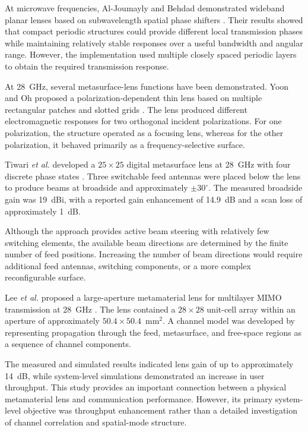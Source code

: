 At microwave frequencies, Al-Joumayly and Behdad demonstrated
wideband planar lenses based on subwavelength spatial phase shifters
\cite{Al-Joumayly2011}. Their results showed that compact
periodic structures could provide different local transmission phases
while maintaining relatively stable responses over a useful bandwidth
and angular range. However, the implementation used multiple closely
spaced periodic layers to obtain the required transmission response.

At 28~GHz, several metasurface-lens functions have been demonstrated.
Yoon and Oh proposed a polarization-dependent thin lens based on
multiple rectangular patches and slotted grids
\cite{Yoon2019}. The lens produced different
electromagnetic responses for two orthogonal incident polarizations.
For one polarization, the structure operated as a focusing lens,
whereas for the other polarization, it behaved primarily as a
frequency-selective surface.

Tiwari \textit{et al.} developed a $25\times25$ digital metasurface
lens at 28~GHz with four discrete phase states
\cite{Tiwari2023}. Three switchable feed antennas were placed
below the lens to produce beams at broadside and approximately
$\pm30^{\circ}$. The measured broadside gain was 19~dBi, with a
reported gain enhancement of 14.9~dB and a scan loss of approximately
1~dB.

Although the approach provides active beam steering with relatively
few switching elements, the available beam directions are determined
by the finite number of feed positions. Increasing the number of beam
directions would require additional feed antennas, switching
components, or a more complex reconfigurable surface.

Lee \textit{et al.} proposed a large-aperture metamaterial lens for
multilayer MIMO transmission at 28~GHz
\cite{Lee2022Large}. The lens contained a $28\times28$
unit-cell array within an aperture of approximately
$50.4\times50.4$~mm$^2$. A channel model was developed by
representing propagation through the feed, metasurface, and
free-space regions as a sequence of channel components.

The measured and simulated results indicated lens gain of up to
approximately 14~dB, while system-level simulations demonstrated an
increase in user throughput. This study provides an important
connection between a physical metamaterial lens and communication
performance. However, its primary system-level objective was
throughput enhancement rather than a detailed investigation of
channel correlation and spatial-mode structure.

